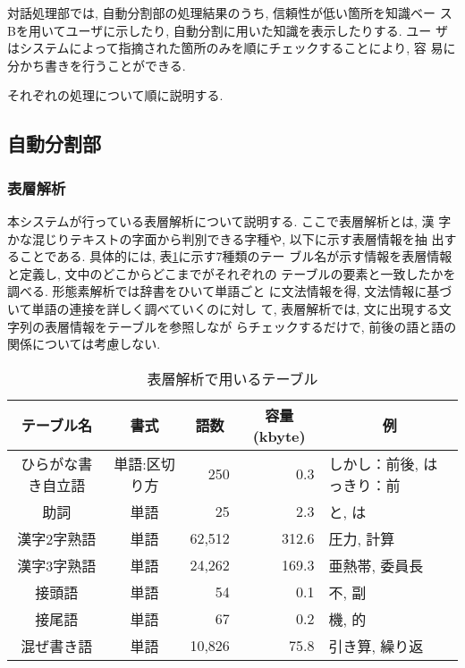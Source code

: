 対話処理部では, 自動分割部の処理結果のうち, 信頼性が低い箇所を知識ベー
スBを用いてユーザに示したり, 自動分割に用いた知識を表示したりする. ユー
ザはシステムによって指摘された箇所のみを順にチェックすることにより, 容
易に分かち書きを行うことができる. 

それぞれの処理について順に説明する. 

\vspace*{-1ex}
\subsection{自動分割部}
\subsubsection{表層解析}
本システムが行っている表層解析について説明する. ここで表層解析とは, 漢
字かな混じりテキストの字面から判別できる字種や, 以下に示す表層情報を抽
出することである. 具体的には, 表\ref{bt-tables}に示す7種類のテー
ブル名が示す情報を表層情報と定義し, 文中のどこからどこまでがそれぞれの
テーブルの要素と一致したかを調べる. 形態素解析では辞書をひいて単語ごと
に文法情報を得, 文法情報に基づいて単語の連接を詳しく調べていくのに対し
て, 表層解析では, 文に出現する文字列の表層情報をテーブルを参照しなが
らチェックするだけで, 前後の語と語の関係については考慮しない. 

\begin{table}[bt]
\begin{center}
\small
\caption{表層解析で用いるテーブル}
\label{bt-tables}
\begin{tabular}{|c|c|r|r|l|} \hline
テーブル名 & 書式 
	& \multicolumn{1}{|c|}{語数} 
	& \multicolumn{1}{|c|}{容量(kbyte)}
	& \multicolumn{1}{|c|}{例}
          \\ \hline \hline
ひらがな書き自立語 & 単語:区切り方 & 250 & 0.3 & しかし：前後, はっきり：前\\ \hline
助詞 & 単語 & 25 & 2.3 & と, は\\ \hline
漢字2字熟語 & 単語 & 62,512 & 312.6 & 圧力, 計算\\ \hline
漢字3字熟語 & 単語 & 24,262 & 169.3 & 亜熱帯, 委員長\\ \hline
接頭語 & 単語 & 54 & 0.1 & 不, 副\\ \hline
接尾語 & 単語 & 67 & 0.2 & 機, 的\\ \hline
混ぜ書き語 & 単語 & 10,826 & 75.8 & 引き算, 繰り返\\ \hline
\end{tabular}
\end{center}
\end{table}
\normalsize

